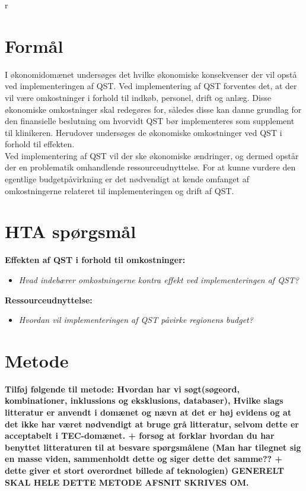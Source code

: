r\section{Formål}
I økonomidomænet undersøges det hvilke økonomiske konsekvenser der vil opstå ved implementeringen af QST. Ved implementering af QST forventes det, at der vil være omkostninger i forhold til indkøb, personel, drift og anlæg. Disse økonomiske omkostninger skal redegøres for, således disse kan danne grundlag for den finansielle beslutning om hvorvidt QST bør implementeres som supplement til klinikeren. Herudover undersøges de økonomiske omkostninger ved QST i forhold til effekten.\\ 
Ved implementering af  QST vil der ske økonomiske ændringer, og dermed opstår der en problematik omhandlende ressourceudnyttelse. For at kunne vurdere den egentlige budgetpåvirkning er det nødvendigt at kende omfanget af  omkostningerne relateret til implementeringen og drift af QST. 


\section{HTA spørgsmål}
\textbf{Effekten af QST i forhold til omkostninger:}
\begin{itemize}
	\item \textit{Hvad indebærer omkostningerne kontra effekt ved implementeringen af QST?} %
\end{itemize}


\textbf{Ressourceudnyttelse:}
\begin{itemize}
	\item \textit{Hvordan vil implementeringen af QST påvirke regionens budget?} %
\end{itemize}


\section{Metode}
\textbf{Tilføj følgende til metode: Hvordan har vi søgt(søgeord, kombinationer, inklussions og eksklusions, databaser), Hvilke slags litteratur er anvendt i domænet og nævn at det er høj evidens og at det ikke har været nødvendigt at bruge grå litteratur, selvom dette er acceptabelt i TEC-domænet. + forsøg at forklar hvordan du har benyttet litteraturen til at besvare spørgsmålene (Man har tilegnet sig en masse viden, sammenholdt dette og siger dette det samme?? + dette giver et stort overordnet billede af teknologien) GENERELT SKAL HELE DETTE METODE AFSNIT SKRIVES OM.}



